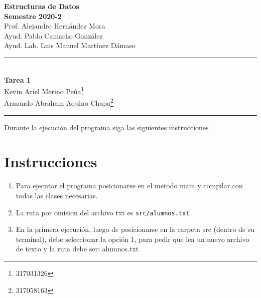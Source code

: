 \documentclass[letterpaper,11pt]{article}
\begin{document}
\begin{center}
\vspace{-134pt}
\textbf{\large Estructuras de Datos}\\[0.2cm]
\textbf{ Semestre 2020-2}\\[0.2cm]
Prof. Alejandro Hernández Mora\\[0.2cm]
Ayud. Pablo Camacho González  \\ [0.2cm]
Ayud. Lab. Luis Manuel Martínez Dámaso   \\ [0.2cm]
\rule{17cm}{0.3mm}\\
\textbf{Tarea 1}\\
Kevin Ariel Merino Peña\footnote{317031326}\\
Armando Abraham Aquino Chapa\footnote{317058163}\\
\end{center}
\vspace{-10pt}
\rule{17cm}{0.3mm}
\begin{flushright}
\vspace{-3pt}
\end{flushright}

\noindent Durante la ejecución del programa siga las siguientes instrucciones

\section*{Instrucciones}

\begin{enumerate}

\item Para ejecutar el programa posicionarse en el metodo main y compilar con todas las clases necesarias.

\item La ruta por omision del archivo txt es \texttt{src/alumnos.txt}

\item En la primera ejecución, luego de posicionarse en la carpeta src (dentro de su terminal), debe seleccionar la opción 1, para pedir que lea un nuevo archivo de texto y la ruta debe ser: alumnos.txt
\end{enumerate}
\end{document}
